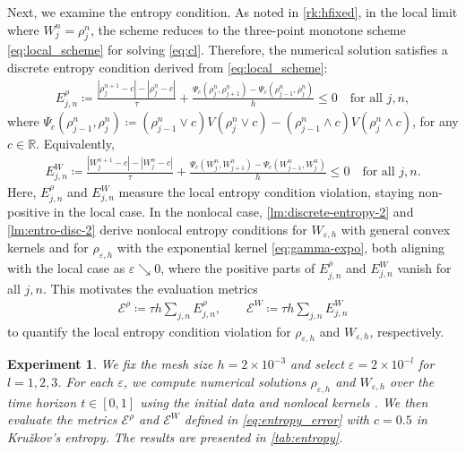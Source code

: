 \documentclass[10pt]{amsart}
\theoremstyle{plain}
\newtheorem{example}{Experiment}[section]
\theoremstyle{definition}
\numberwithin{equation}{section}
\newcommand{\eps}{{\varepsilon}}
\begin{document}
Next, we examine the entropy condition. As noted in \cref{rk:hfixed}, in the local limit where $W_j^n=\rho_j^n$, the scheme  reduces to the three-point monotone scheme \cref{eq:local_scheme} for solving \cref{eq:cl}. Therefore, the numerical solution satisfies a discrete entropy condition derived from \cref{eq:local_scheme}:
\begin{align*}
E_{j,n}^\rho \coloneqq \frac{|\rho_j^{n+1} - c| - |\rho_j^n - c|}{\tau} + \frac{ \Psi_c(\rho_j^n, \rho_{j+1}^n) - \Psi_c(\rho_{j-1}^n, \rho_j^n) }{h} \leq 0 \quad \text{for all } j, n,
\end{align*}
where $\Psi_c(\rho_{j-1}^n, \rho_j^n) \coloneqq (\rho_{j-1}^n \vee c) V(\rho_j^n \vee c) - (\rho_{j-1}^n \wedge c) V(\rho_j^n \wedge c)$, for any $c \in \mathbb{R}$. Equivalently,
\begin{align*}
E_{j,n}^W \coloneqq \frac{|W_j^{n+1} - c| - |W_j^n - c|}{\tau} + \frac{ \Psi_c(W_j^n, W_{j+1}^n) -\Psi_c(W_{j-1}^n, W_j^n) }{h} \leq 0 \quad \text{for all } j, n.
\end{align*}
Here, $E_{j,n}^\rho$ and $E_{j,n}^W$ measure the local entropy condition violation, staying non-positive in the local case. In the nonlocal case, \cref{lm:discrete-entropy-2} and \cref{lm:entro-disc-2} derive nonlocal entropy conditions for $W_{\eps,h}$ with general convex kernels and for $\rho_{\eps,h}$ with the exponential kernel \cref{eq:gamma-expo}, both aligning with the local case as $\eps\searrow0$, where the positive parts of $E_{j,n}^\rho$ and $E_{j,n}^W$ vanish for all $j,n$. This motivates the evaluation metrics
\begin{align}\label{eq:entropy_error}
\mathcal{E}^\rho \coloneqq \tau h \sum_{j,n} E_{j,n}^\rho, \qquad \mathcal{E}^W \coloneqq \tau h \sum_{j,n} E_{j,n}^W
\end{align}
to quantify the local entropy condition violation for $\rho_{\eps,h}$ and $W_{\eps,h}$, respectively. 

\begin{example}
We fix the mesh size $h=2\times10^{-3}$ and select $\varepsilon=2\times10^{-l}$ for $l=1,2,3$. For each $\varepsilon$, we compute numerical solutions $\rho_{\varepsilon,h}$ and $W_{\varepsilon,h}$ over the time horizon $t\in[0,1]$ using the initial data  and nonlocal kernels . We then evaluate the metrics $\mathcal{E}^\rho$ and $\mathcal{E}^W$ defined in \cref{eq:entropy_error} with $c=0.5$ in Kru\v{z}kov's entropy. The results are presented in \cref{tab:entropy}.
\end{example}
\end{document}
